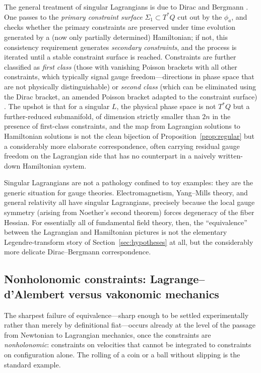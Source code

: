 \documentclass[11pt]{article}
\begin{document}
The general treatment of singular Lagrangians is due to Dirac and Bergmann \citep{dirac1964}. One passes to the \emph{primary constraint surface} $\Sigma_1 \subset T^*Q$ cut out by the $\phi_a$, and checks whether the primary constraints are preserved under time evolution generated by a (now only partially determined) Hamiltonian; if not, this consistency requirement generates \emph{secondary constraints}, and the process is iterated until a stable constraint surface is reached. Constraints are further classified as \emph{first class} (those with vanishing Poisson brackets with all other constraints, which typically signal gauge freedom---directions in phase space that are not physically distinguishable) or \emph{second class} (which can be eliminated using the Dirac bracket, an amended Poisson bracket adapted to the constraint surface) \citep{henneauxteitelboim1992}. The upshot is that for a singular $L$, the physical phase space is not $T^*Q$ but a further-reduced submanifold, of dimension strictly smaller than $2n$ in the presence of first-class constraints, and the map from Lagrangian solutions to Hamiltonian solutions is not the clean bijection of Proposition~\ref{prop:regular} but a considerably more elaborate correspondence, often carrying residual gauge freedom on the Lagrangian side that has no counterpart in a naively written-down Hamiltonian system.

Singular Lagrangians are not a pathology confined to toy examples: they are the generic situation for gauge theories. Electromagnetism, Yang--Mills theory, and general relativity all have singular Lagrangians, precisely because the local gauge symmetry (arising from Noether's second theorem) forces degeneracy of the fiber Hessian. For essentially all of fundamental field theory, then, the ``equivalence'' between the Lagrangian and Hamiltonian pictures is not the elementary Legendre-transform story of Section~\ref{sec:hypotheses} at all, but the considerably more delicate Dirac--Bergmann correspondence.

\subsection{Nonholonomic constraints: Lagrange--d'Alembert versus vakonomic mechanics}
\label{sec:nonholonomic}

The sharpest failure of equivalence---sharp enough to be settled experimentally rather than merely by definitional fiat---occurs already at the level of the passage from Newtonian to Lagrangian mechanics, once the constraints are \emph{nonholonomic}: constraints on velocities that cannot be integrated to constraints on configuration alone. The rolling of a coin or a ball without slipping is the standard example.
\end{document}
